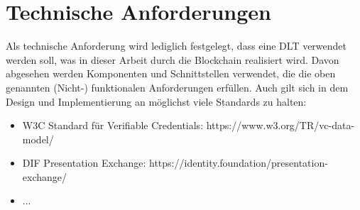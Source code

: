 \section{Technische Anforderungen}
Als technische Anforderung wird lediglich festgelegt, dass eine DLT verwendet werden soll, was in dieser Arbeit durch die Blockchain realisiert wird. Davon abgesehen werden Komponenten und Schnittstellen verwendet, die die oben genannten (Nicht-) funktionalen Anforderungen erfüllen.
Auch gilt sich in dem Design und Implementierung an möglichst viele Standards zu halten:
\begin{itemize}
	\item W3C Standard für Verifiable Credentials: https://www.w3.org/TR/vc-data-model/
	\item DIF Presentation Exchange: https://identity.foundation/presentation-exchange/
	\item ...
\end{itemize}